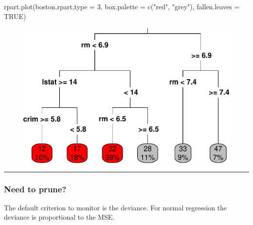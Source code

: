 \documentclass[
  letterpaper,
  DIV=11,
  numbers=noendperiod]{scrartcl}
\newenvironment{Shaded}{\begin{snugshade}}{\end{snugshade}}
\newcommand{\AttributeTok}[1]{\textcolor[rgb]{0.40,0.45,0.13}{#1}}
\newcommand{\ConstantTok}[1]{\textcolor[rgb]{0.56,0.35,0.01}{#1}}
\newcommand{\DecValTok}[1]{\textcolor[rgb]{0.68,0.00,0.00}{#1}}
\newcommand{\FunctionTok}[1]{\textcolor[rgb]{0.28,0.35,0.67}{#1}}
\newcommand{\NormalTok}[1]{\textcolor[rgb]{0.00,0.23,0.31}{#1}}
\newcommand{\OtherTok}[1]{\textcolor[rgb]{0.00,0.23,0.31}{#1}}
\newcommand{\SpecialCharTok}[1]{\textcolor[rgb]{0.37,0.37,0.37}{#1}}
\newcommand{\StringTok}[1]{\textcolor[rgb]{0.13,0.47,0.30}{#1}}
\begin{document}
\begin{Shaded}
\begin{Highlighting}[]
\FunctionTok{rpart.plot}\NormalTok{(boston.rpart,}\AttributeTok{type =} \DecValTok{3}\NormalTok{, }\AttributeTok{box.palette =} \FunctionTok{c}\NormalTok{(}\StringTok{"red"}\NormalTok{, }\StringTok{"grey"}\NormalTok{), }\AttributeTok{fallen.leaves =} \ConstantTok{TRUE}\NormalTok{)}
\end{Highlighting}
\end{Shaded}

\begin{figure}[H]

{\centering \includegraphics{L13_files/figure-pdf/unnamed-chunk-7-2.pdf}

}

\end{figure}

\begin{center}\rule{0.5\linewidth}{0.5pt}\end{center}

\hypertarget{need-to-prune}{%
\subsubsection{Need to prune?}\label{need-to-prune}}

The default criterion to monitor is the deviance. For normal regression
the deviance is proportional to the MSE.

\begin{Shaded}
\end{Shaded}
\end{document}
